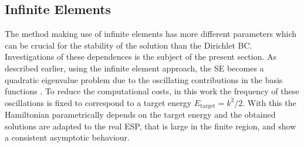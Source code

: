 \subsection{Infinite Elements}
\label{sec:iBCbench}
The method making use of infinite elements has more different parameters which can be crucial for the stability of the solution than the Dirichlet BC.
Investigations of these dependences is the subject of the present section.
As described earlier, using the infinite element approach, the SE becomes a quadratic eigenvalue problem due to the oscillating contributions in the basis functions .
To reduce the computational costs, in this work the frequency of these oscillations is fixed to correspond to a target energy $E_\text{target}=k^2/2$.
With this the Hamiltonian parametrically depends on the target energy and the obtained solutions are adapted to the real ESP, that is large in the finite region, and show a consistent asymptotic behaviour.

